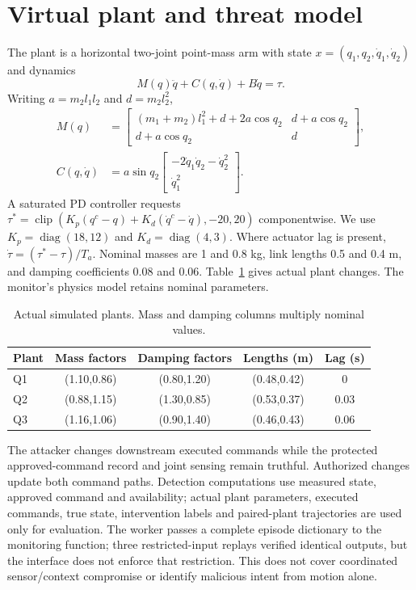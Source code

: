 \documentclass[11pt]{article}
\begin{document}
\section{Virtual plant and threat model}
The plant is a horizontal two-joint point-mass arm with state $x=(q_1,q_2,\dot q_1,\dot q_2)$ and dynamics
\begin{equation}
 M(q)\ddot q+C(q,\dot q)+B\dot q=\tau.
\end{equation}
Writing $a=m_2l_1l_2$ and $d=m_2l_2^2$,
\begin{align}
 M(q)&=\begin{bmatrix}(m_1+m_2)l_1^2+d+2a\cos q_2&d+a\cos q_2\\d+a\cos q_2&d\end{bmatrix},\\
 C(q,\dot q)&=a\sin q_2\begin{bmatrix}-2\dot q_1\dot q_2-\dot q_2^2\\\dot q_1^2\end{bmatrix}.
\end{align}
A saturated PD controller requests $\tau^*=\operatorname{clip}(K_p(q^c-q)+K_d(\dot q^c-\dot q),-20,20)$ componentwise. We use $K_p=\operatorname{diag}(18,12)$ and $K_d=\operatorname{diag}(4,3)$. Where actuator lag is present, $\dot\tau=(\tau^*-\tau)/T_a$. Nominal masses are 1 and 0.8 kg, link lengths 0.5 and 0.4 m, and damping coefficients 0.08 and 0.06. Table~\ref{tab:plants} gives actual plant changes. The monitor's physics model retains nominal parameters.

\begin{table}[htbp]\centering\small
\caption{Actual simulated plants. Mass and damping columns multiply nominal values.}\label{tab:plants}
\begin{tabular}{lcccc}\toprule
Plant & Mass factors & Damping factors & Lengths (m) & Lag (s)\\\midrule
Q1 & (1.10,0.86) & (0.80,1.20) & (0.48,0.42) & 0\\
Q2 & (0.88,1.15) & (1.30,0.85) & (0.53,0.37) & 0.03\\
Q3 & (1.16,1.06) & (0.90,1.40) & (0.46,0.43) & 0.06\\\bottomrule
\end{tabular}
\end{table}

The attacker changes downstream executed commands while the protected approved-command record and joint sensing remain truthful. Authorized changes update both command paths. Detection computations use measured state, approved command and availability; actual plant parameters, executed commands, true state, intervention labels and paired-plant trajectories are used only for evaluation. The worker passes a complete episode dictionary to the monitoring function; three restricted-input replays verified identical outputs, but the interface does not enforce that restriction. This does not cover coordinated sensor/context compromise or identify malicious intent from motion alone.
\end{document}
